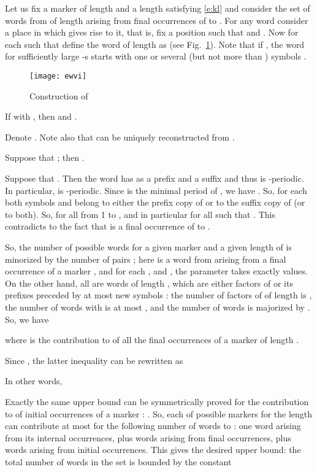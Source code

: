 \documentclass[runningheads,envcountsect,envcountsame]{llncs}
\begin{document}
Let us fix a marker  of length  and a length  satisfying \eqref{e:kl} and consider the set  of words from  of length  arising from final occurrences of  to . For any word  consider a place in  which gives rise to it, that is, fix a position  such that  and . Now for each  such that  define the word  of length  as
 (see Fig.~\ref{f:1}). Note that if , the word  for sufficiently large -s starts with one or several (but not more than ) symbols .
\begin{center}
\begin{figure}
\centering \texttt{[image: ewvi]}
\caption{Construction of }\label{f:1}
\end{figure}
\end{center}

\begin{lemma}
 If  with , then  and .
\end{lemma}
 Denote . Note also that  can be uniquely reconstructed from .

Suppose that ; then .

Suppose that . Then the word  has  as a prefix and a suffix and thus is -periodic. In particular,  is -periodic. Since  is the minimal period of , we have . So, for each  both symbols  and  belong to either the prefix copy of  or to the suffix copy of  (or to both). So,  for all  from 1 to , and in particular for all  such that . This contradicts to the fact that  is a final occurrence of  to .\hfill 


\medskip
So, the number of possible words  for a given marker  and a given length  of  is minorized by the number of pairs ; here  is a word from  arising from a final occurrence of a marker , and for each ,  and , the parameter  takes exactly  values. On the other hand, all  are words of length , which are either factors of  or its prefixes preceded by at most  new symbols : the number of factors of  of length  is , the number of words with  is at most , and the number of words  is majorized by . So, we have

where  is the contribution to  of all the final occurrences of a marker  of length .

Since , the latter inequality can be rewritten as

In other words,


Exactly the same upper bound can be symmetrically proved for the contribution to  of initial occurrences of a marker : . So, each of  possible markers for the length  can contribute at most for the following number of words to : one word arising from its internal occurrences, plus  words arising from final occurrences, plus  words arising from initial occurrences. This gives the desired upper bound: the total number of words in the set  is bounded by the constant
\end{document}
